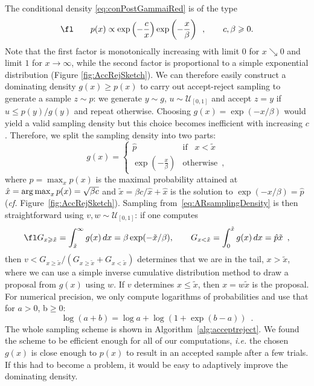 The conditional density \eqref{eq:conPostGammaiRed} is of the type
\begin{equation}
\fl \qquad p(x) \propto \exp \left(- \frac{c}{x} \right) \exp \left(- \frac{x}{\beta} \right) \enspace, \qquad c, \beta \geqslant 0.
\end{equation}
Note that the first factor is monotonically increasing with limit $0$ for $x \searrow 0$ and limit $1$ for $x \rightarrow \infty$, while the second factor is proportional to a simple exponential distribution (\lcf Figure \ref{fig:AccRejSketch}). We can therefore easily construct a dominating density $g(x) \geqslant p(x)$ to carry out accept-reject sampling \cite[Section 2.3.2]{RoCa05} to generate a sample $z \sim p$: we generate $y \sim g$, $u \sim \mathcal{U}_{[0,1]}$ and accept $z = y$ if $u \leqslant p(y)/g(y)$ and repeat otherwise. Choosing $g(x) = \exp \left(- x/\beta\right)$ would yield a valid sampling density but this choice becomes inefficient with increasing $c$. Therefore, we split the sampling density into two parts:
\begin{equation}
g(x) = 
\begin{cases}
\hat p & \text{if} \hspace{10pt} x < \tilde{x} \\
\exp \left(- \frac{x}{\beta} \right)	& \text{otherwise}  \enspace,
\end{cases}
\label{eq:ARsamplingDensity}
\end{equation}
where $\hat p = \max_x p(x)$ is the maximal probability attained at $\hat x = \mathop{\mathrm{arg}\,\mathrm{max}}_x p(x) = \sqrt{\beta c}$ and $\tilde{x} = \beta c/\hat x + \hat x$ is the solution to $\exp \left(- x/\beta\right) = \hat p$ (\textit{cf.} Figure~\ref{fig:AccRejSketch}). Sampling from~\eqref{eq:ARsamplingDensity} is then straightforward using $v, w \sim \mathcal{U}_{[0,1]}$: if one computes
\begin{equation}
\fl G_{x\geqslant \tilde{x}} = \int_{\tilde{x}}^\infty g(x) \, dx = \beta \exp(- \tilde{x}/\beta), \qquad
G_{x < \tilde{x}} = \int_0^{\tilde{x}} g(x) \, dx = \hat{p} \tilde{x} \enspace,
\end{equation}
then $v <  G_{x\geqslant \tilde{x}} / (G_{x\geqslant \tilde{x}} + G_{x < \tilde{x}})$ determines that we are in the tail, $x > \tilde{x}$, where we can use a simple inverse cumulative distribution method to draw a proposal from $g(x)$ using $w$. If $v$ determines $x \leqslant \tilde{x}$, then $x = w \tilde{x}$ is the proposal. For numerical precision, we only compute logarithms of probabilities and use that for $a > 0$, b$\geqslant 0$:
 \begin{equation}
 \log \left(a +b \right) = \log a + \log \left(1 + \exp \left(b - a \right)\right) \enspace .
 \end{equation}
 The whole sampling scheme is shown in Algorithm~\ref{alg:acceptreject}. We found the scheme to be efficient enough for all of our computations, \textit{i.e.} the chosen $g(x)$ is close enough to $p(x)$ to result in an accepted sample after a few trials. If this had to become a problem, it would be easy to adaptively improve the dominating density.

